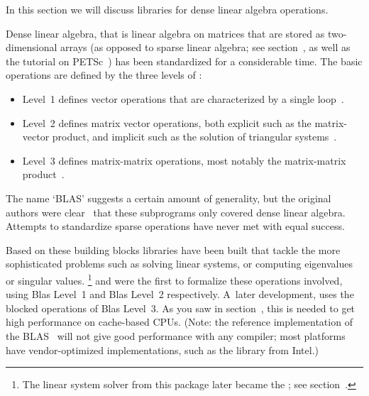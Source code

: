 

In this section we will discuss libraries for dense linear
algebra operations.

Dense linear algebra, that is linear algebra on matrices that are
stored as two-dimensional arrays (as opposed to sparse linear algebra;
see section~, as well as the
tutorial on PETSc~) has been standardized for a
considerable time. The basic operations are defined by the three
levels of :
\begin{itemize}
\item Level~1 defines vector operations that are characterized by a
  single loop~\cite{Lawson:blas}.
\item Level~2 defines matrix vector operations, both explicit such as
  the matrix-vector product, and implicit such as the solution of
  triangular systems~\cite{BLAS2}.
\item Level~3 defines matrix-matrix operations, most notably the
  matrix-matrix product~\cite{BLAS3}.
\end{itemize}
The name `BLAS' suggests a certain amount of generality, but the
original authors were clear~\cite{Lawson:blas} that these subprograms
only covered dense linear algebra. Attempts to standardize sparse
operations have never met with equal success.

Based on these building blocks libraries have been built that tackle
the more sophisticated problems such as solving linear systems, or
computing eigenvalues or singular values.
\footnote{The linear system solver from this
  package later became the ; see
  section~.} and  were the first to formalize
these operations involved, using Blas Level~1 and Blas Level~2
respectively.  A~later development,  uses the
blocked operations of Blas Level~3. As you saw in
section~, this is needed to get high performance on
cache-based CPUs. (Note: the reference implementation of the
BLAS~\cite{reference-blas} will not give good performance with any
compiler; most platforms have vendor-optimized implementations, such
as the  library from Intel.)

